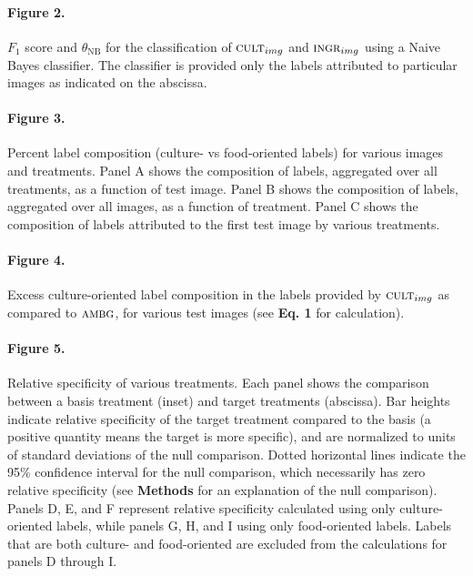 \documentclass[a4paper]{report}
\begin{document}
\paragraph{Figure 2.}
$F_1$ score and $\theta_\text{NB}$ for the classification of 
$\textsc{cult}_{img}$ and $\textsc{ingr}_{img}$ using a Naive Bayes 
classifier.  The classifier is provided only the labels attributed to
particular images as indicated on the abscissa.

\paragraph{Figure 3.}
Percent label composition (culture- vs food-oriented labels) for 
various images and treatments.  Panel A shows the composition of 
labels, aggregated over all treatments, as a function of test image.
Panel B shows the composition of labels, aggregated over all images, as
a function of treatment.  Panel C shows the composition of labels 
attributed to the first test image by various treatments.

\paragraph{Figure 4.}
Excess culture-oriented label composition in the labels provided
by $\textsc{cult}_{img}$ as compared to $\textsc{ambg}$, for various
test images (see \textbf{Eq. 1} for calculation).

\paragraph{Figure 5.}
Relative specificity of various treatments.
Each panel shows the comparison between a basis treatment (inset) and 
target treatments (abscissa).
Bar heights indicate relative specificity of the target 
treatment compared to the basis (a positive quantity means the target 
is more specific), and are normalized to units of standard 
deviations of the null comparison.  Dotted horizontal lines indicate
the 95\% confidence interval for the null comparison, which necessarily
has zero relative specificity (see \textbf{Methods} 
for an explanation of the null comparison).  Panels D, E, and F 
represent relative specificity calculated using only culture-oriented
labels, while panels G, H, and I using only food-oriented labels.
Labels that are both culture- and food-oriented are excluded from the
calculations for panels D through I.
\end{document}
